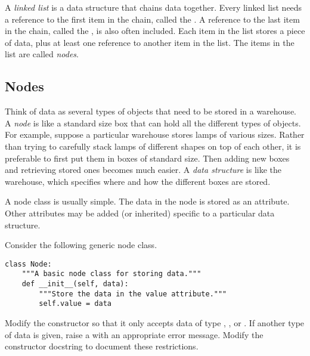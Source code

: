 \labdependencies{}



A \emph{linked list} is a data structure that chains data together.
Every linked list needs a reference to the first item in the chain, called the .
A reference to the last item in the chain, called the , is also often included.
Each item in the list stores a piece of data, plus at least one reference to another item in the list.
The items in the list are called \emph{nodes}.

\subsection*{Nodes} %

Think of data as several types of objects that need to be stored in a warehouse.
A \emph{node} is like a standard size box that can hold all the different types of objects.
For example, suppose a particular warehouse stores lamps of various sizes.
Rather than trying to carefully stack lamps of different shapes on top of each other, it is preferable to first put them in boxes of standard size.
Then adding new boxes and retrieving stored ones becomes much easier.
A \emph{data structure} is like the warehouse, which specifies where and how the different boxes are stored.

A node class is usually simple.
The data in the node is stored as an attribute.
Other attributes may be added (or inherited) specific to a particular data structure.

\begin{problem} %
Consider the following generic node class.
\begin{lstlisting}
class Node:
    """A basic node class for storing data."""
    def __init__(self, data):
        """Store the data in the value attribute."""
        self.value = data
\end{lstlisting}

Modify the constructor so that it only accepts data of type , , or .
If another type of data is given, raise a  with an appropriate error message.
Modify the constructor docstring to document these restrictions.
\end{problem}

